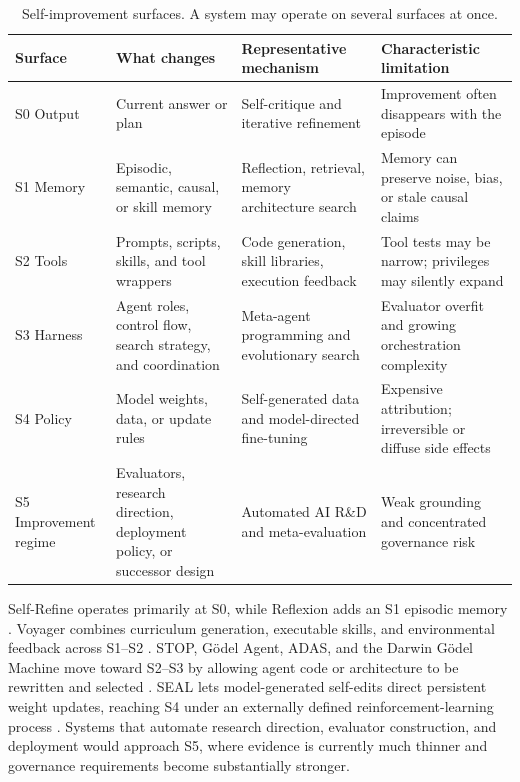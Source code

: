 \documentclass[11pt,a4paper]{article}
\begin{document}
\begin{table}[H]
\centering\small
\begin{tabularx}{\textwidth}{@{}P{1.45cm}P{2.7cm}Y Y@{}}
\toprule
\textbf{Surface} & \textbf{What changes} & \textbf{Representative mechanism} & \textbf{Characteristic limitation} \\
\midrule
S0 Output & Current answer or plan & Self-critique and iterative refinement & Improvement often disappears with the episode \\
S1 Memory & Episodic, semantic, causal, or skill memory & Reflection, retrieval, memory architecture search & Memory can preserve noise, bias, or stale causal claims \\
S2 Tools & Prompts, scripts, skills, and tool wrappers & Code generation, skill libraries, execution feedback & Tool tests may be narrow; privileges may silently expand \\
S3 Harness & Agent roles, control flow, search strategy, and coordination & Meta-agent programming and evolutionary search & Evaluator overfit and growing orchestration complexity \\
S4 Policy & Model weights, data, or update rules & Self-generated data and model-directed fine-tuning & Expensive attribution; irreversible or diffuse side effects \\
S5 Improvement regime & Evaluators, research direction, deployment policy, or successor design & Automated AI R\&D and meta-evaluation & Weak grounding and concentrated governance risk \\
\bottomrule
\end{tabularx}
\caption{Self-improvement surfaces. A system may operate on several surfaces at once.}
\label{tab:surfaces}
\end{table}

Self-Refine operates primarily at S0, while Reflexion adds an S1 episodic memory \cite{selfrefine,reflexion}. Voyager combines curriculum generation, executable skills, and environmental feedback across S1--S2 \cite{voyager}. STOP, G\"odel Agent, ADAS, and the Darwin G\"odel Machine move toward S2--S3 by allowing agent code or architecture to be rewritten and selected \cite{stop,godelagent,adas,dgm}. SEAL lets model-generated self-edits direct persistent weight updates, reaching S4 under an externally defined reinforcement-learning process \cite{seal}. Systems that automate research direction, evaluator construction, and deployment would approach S5, where evidence is currently much thinner and governance requirements become substantially stronger.
\end{document}
